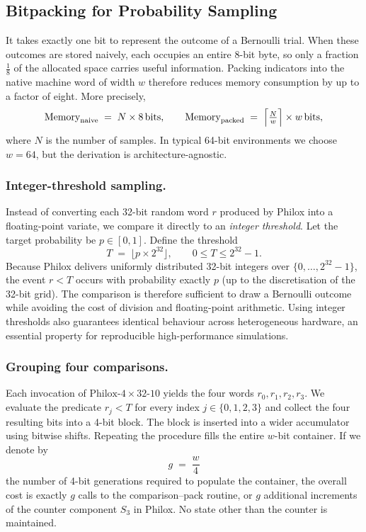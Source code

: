 \subsection{Bitpacking for Probability Sampling}
\label{sec:bitpack-prob-sampling}

It takes exactly one bit to represent the outcome of a Bernoulli trial. When these outcomes are stored naively, each occupies an entire \(8\)-bit byte, so only a fraction \(\tfrac{1}{8}\) of the allocated space carries useful information. Packing indicators into the native machine word of width \(w\) therefore reduces memory consumption by up to a factor of eight. More precisely,
\[
  \text{Memory}_{\text{naive}} \;=\; N \times 8\,\text{bits},
  \qquad
  \text{Memory}_{\text{packed}} \;=\;\Bigl\lceil\tfrac{N}{w}\Bigr\rceil \times w\,\text{bits},
\]
where \(N\) is the number of samples. In typical 64-bit environments we choose \(w = 64\), but the derivation is architecture-agnostic.

\subsubsection{Integer-threshold sampling.}  Instead of converting each 32-bit random word \(r\) produced by Philox into a floating-point variate, we compare it directly to an \emph{integer threshold}.  Let the target probability be \(p \in [0,1]\).  Define the threshold
\[
   T \;=\; \bigl\lfloor p \times 2^{32} \bigr\rfloor,\qquad 0 \le T \le 2^{32}-1.
\]
Because Philox delivers uniformly distributed 32-bit integers over \(\{0,\dots,2^{32}-1\}\), the event \(r < T\) occurs with probability exactly \(p\) (up to the discretisation of the 32-bit grid).  The comparison is therefore sufficient to draw a Bernoulli outcome while avoiding the cost of division and floating-point arithmetic.  Using integer thresholds also guarantees identical behaviour across heterogeneous hardware, an essential property for reproducible high-performance simulations.

\subsubsection{Grouping four comparisons.}  Each invocation of \(\mathrm{Philox\text{-}4\times32\text{-}10}\) yields the four words \(r_0, r_1, r_2, r_3\).  We evaluate the predicate \(r_j < T\) for every index \(j \in \{0,1,2,3\}\) and collect the four resulting bits into a 4-bit block.  The block is inserted into a wider accumulator using bitwise shifts.  Repeating the procedure fills the entire \(w\)-bit container.  If we denote by
\[
   g \;=\; \frac{w}{4}
\]
 the number of 4-bit generations required to populate the container, the overall cost is exactly \(g\) calls to the comparison–pack routine, or \(g\) additional increments of the counter component \(S_3\) in Philox.  No state other than the counter is maintained.

